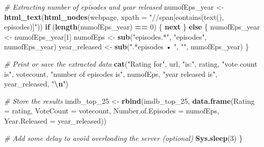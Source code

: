 \documentclass[
]{article}
\newenvironment{Shaded}{\begin{snugshade}}{\end{snugshade}}
\newcommand{\AttributeTok}[1]{\textcolor[rgb]{0.13,0.29,0.53}{#1}}
\newcommand{\CommentTok}[1]{\textcolor[rgb]{0.56,0.35,0.01}{\textit{#1}}}
\newcommand{\ControlFlowTok}[1]{\textcolor[rgb]{0.13,0.29,0.53}{\textbf{#1}}}
\newcommand{\DecValTok}[1]{\textcolor[rgb]{0.00,0.00,0.81}{#1}}
\newcommand{\FunctionTok}[1]{\textcolor[rgb]{0.13,0.29,0.53}{\textbf{#1}}}
\newcommand{\NormalTok}[1]{#1}
\newcommand{\OtherTok}[1]{\textcolor[rgb]{0.56,0.35,0.01}{#1}}
\newcommand{\SpecialCharTok}[1]{\textcolor[rgb]{0.81,0.36,0.00}{\textbf{#1}}}
\newcommand{\StringTok}[1]{\textcolor[rgb]{0.31,0.60,0.02}{#1}}
\begin{document}
\begin{Shaded}
\begin{Highlighting}[]
  \CommentTok{\# Extracting number of episodes and year released}
\NormalTok{  numofEps\_year }\OtherTok{\textless{}{-}} \FunctionTok{html\_text}\NormalTok{(}\FunctionTok{html\_nodes}\NormalTok{(webpage, }\AttributeTok{xpath =} \StringTok{"//span[contains(text(), \textquotesingle{}episodes\textquotesingle{})]"}\NormalTok{))}
  \ControlFlowTok{if}\NormalTok{ (}\FunctionTok{length}\NormalTok{(numofEps\_year) }\SpecialCharTok{==} \DecValTok{0}\NormalTok{) \{}
    \ControlFlowTok{next}
\NormalTok{  \} }\ControlFlowTok{else}\NormalTok{ \{}
\NormalTok{    numofEps\_year }\OtherTok{\textless{}{-}}\NormalTok{ numofEps\_year[}\DecValTok{1}\NormalTok{]}
\NormalTok{    numofEps }\OtherTok{\textless{}{-}} \FunctionTok{sub}\NormalTok{(}\StringTok{"episodes.*"}\NormalTok{, }\StringTok{"episodes"}\NormalTok{, numofEps\_year)}
\NormalTok{    year\_released }\OtherTok{\textless{}{-}} \FunctionTok{sub}\NormalTok{(}\StringTok{".*episodes • "}\NormalTok{, }\StringTok{""}\NormalTok{, numofEps\_year)}
\NormalTok{  \}}
  
  \CommentTok{\# Print or save the extracted data}
  \FunctionTok{cat}\NormalTok{(}\StringTok{"Rating for"}\NormalTok{, url, }\StringTok{"is:"}\NormalTok{, rating, }\StringTok{"vote count is"}\NormalTok{, votecount, }\StringTok{"number of episodes is"}\NormalTok{, numofEps, }\StringTok{"year released is"}\NormalTok{, year\_released, }\StringTok{"}\SpecialCharTok{\textbackslash{}n}\StringTok{"}\NormalTok{)}
  
  \CommentTok{\# Store the results}
\NormalTok{  imdb\_top\_25 }\OtherTok{\textless{}{-}} \FunctionTok{rbind}\NormalTok{(imdb\_top\_25, }\FunctionTok{data.frame}\NormalTok{(}\AttributeTok{Rating =}\NormalTok{ rating, }\AttributeTok{VoteCount =}\NormalTok{ votecount, }\AttributeTok{Number.of.Episodes =}\NormalTok{ numofEps, }\AttributeTok{Year.Released =}\NormalTok{ year\_released))}
  
  \CommentTok{\# Add some delay to avoid overloading the server (optional)}
  \FunctionTok{Sys.sleep}\NormalTok{(}\DecValTok{3}\NormalTok{)}
\NormalTok{\}}
\end{Highlighting}
\end{Shaded}
\end{document}
